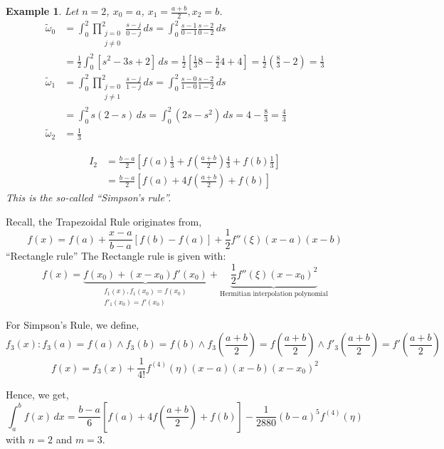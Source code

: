 \documentclass{article}
\newtheorem{example}{Example}
\begin{document}
\begin{example}
  Let $n = 2$, $x_0 = a$, $x_1 = \frac{a + b}{2}, x_2 = b$.
  \begin{align*}
    \tilde\omega_0
      &= \int_0^2 \prod_{\substack{j=0 \\ j \neq 0}}^2 \frac{s - j}{0 - j} \, ds = \int_0^2 \frac{s - 1}{0 - 1} \frac{s - 2}{0 - 2} \, ds \\
      &= \frac12 \int_0^2 \left[s^2 - 3s + 2\right] \, ds = \frac12 \left[\frac13 8 - \frac32 4 + 4\right] = \frac12 \left(\frac83 - 2\right) = \frac13 \\
    \tilde\omega_1
      &= \int_0^2 \prod_{\substack{j=0 \\ j \neq 1}}^2 \frac{s - j}{1 - j} \, ds = \int_0^2 \frac{s - 0}{1 - 0} \frac{s - 2}{1 - 2} \, ds \\
      &= \int_0^2 s (2 - s) \, ds = \int_0^2 (2s - s^2) \, ds = 4 - \frac83 = \frac43 \\
    \tilde\omega_2
      &= \frac13
  \end{align*}

  \begin{align*}
    I_2 &= \frac{b - a}{2} \left[f(a) \frac13 + f\left(\frac{a + b}{2}\right) \frac43 + f(b) \frac13\right] \\
        &= \frac{b - a}{2} \left[f(a) + 4 f(\frac{a + b}{2}) + f(b)\right]
  \end{align*}
  This is the so-called \enquote{Simpson's rule}.
\end{example}

Recall, the Trapezoidal Rule originates from,
\[ f(x) = f(a) + \frac{x - a}{b - a} \left[f(b) - f(a)\right] + \frac12 f''(\xi) (x - a) (x - b) \]
\enquote{Rectangle rule}
The Rectangle rule is given with:
\[ f(x) = \underbrace{f(x_0) + (x - x_0) f'(x_0)}_{\substack{f_1(x), f_1(x_0) = f(x_0) \\ f'_1(x_0) = f'(x_0)}} + \underbrace{\frac12 f''(\xi) (x - x_0)^2}_{\text{Hermitian interpolation polynomial}} \]

For Simpson's Rule, we define,
\[ f_3(x): f_3(a) = f(a) \land f_3(b) = f(b) \land f_3(\frac{a + b}{2}) = f(\frac{a+b}{2}) \land f'_3(\frac{a+b}{2}) = f'(\frac{a+b}{2}) \]
\[ f(x) = f_3(x) + \frac{1}{4!} f^{(4)}(\eta) (x - a) (x - b) (x - x_0)^2 \]

Hence, we get,
\[ \int_a^b f(x) \, dx = \frac{b - a}{6} \left[f(a) + 4 f(\frac{a+b}{2}) + f(b)\right] - \frac{1}{2880}(b - a)^5 f^{(4)}(\eta) \]
with $n=2$ and $m=3$.
\end{document}
